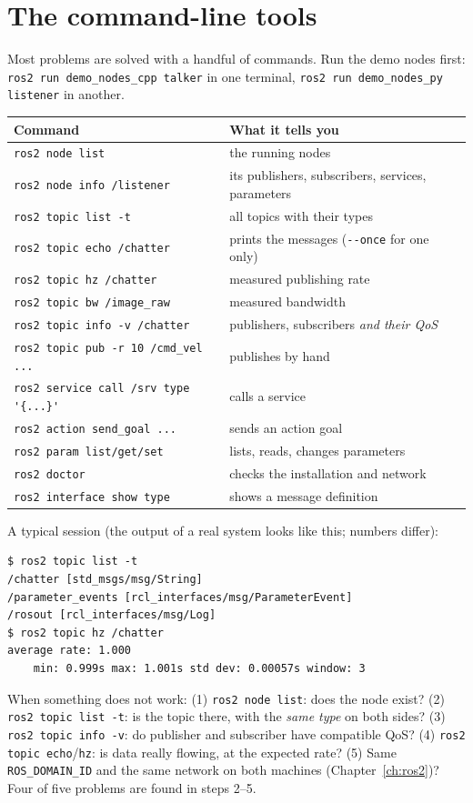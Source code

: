 \section*{The command-line tools}
Most problems are solved with a handful of commands. Run the demo nodes first: \verb!ros2 run demo_nodes_cpp talker! in one terminal, \verb!ros2 run demo_nodes_py listener! in another.
\begin{center}
\renewcommand{\arraystretch}{1.25}
\begin{tabular}{p{6.4cm}p{6.4cm}}
\textbf{Command} & \textbf{What it tells you}\\ \hline
\verb!ros2 node list! & the running nodes\\
\verb!ros2 node info /listener! & its publishers, subscribers, services, parameters\\
\verb!ros2 topic list -t! & all topics with their types\\
\verb!ros2 topic echo /chatter! & prints the messages (\verb!--once! for one only)\\
\verb!ros2 topic hz /chatter! & measured publishing rate\\
\verb!ros2 topic bw /image_raw! & measured bandwidth\\
\verb!ros2 topic info -v /chatter! & publishers, subscribers \emph{and their QoS}\\
\verb!ros2 topic pub -r 10 /cmd_vel ...! & publishes by hand\\
\verb!ros2 service call /srv type '{...}'! & calls a service\\
\verb!ros2 action send_goal ...! & sends an action goal\\
\verb!ros2 param list/get/set! & lists, reads, changes parameters\\
\verb!ros2 doctor! & checks the installation and network\\
\verb!ros2 interface show type! & shows a message definition\\
\end{tabular}
\end{center}
A typical session (the output of a real system looks like this; numbers differ):
\begin{verbatim}
$ ros2 topic list -t
/chatter [std_msgs/msg/String]
/parameter_events [rcl_interfaces/msg/ParameterEvent]
/rosout [rcl_interfaces/msg/Log]
$ ros2 topic hz /chatter
average rate: 1.000
    min: 0.999s max: 1.001s std dev: 0.00057s window: 3
\end{verbatim}
\begin{keyidea}
When something does not work: (1) \verb!ros2 node list!: does the node exist? (2) \verb!ros2 topic list -t!: is the topic there, with the \emph{same type} on both sides? (3) \verb!ros2 topic info -v!: do publisher and subscriber have compatible QoS? (4) \verb!ros2 topic echo!/\verb!hz!: is data really flowing, at the expected rate? (5) Same \verb!ROS_DOMAIN_ID! and the same network on both machines (Chapter~\ref{ch:ros2})? Four of five problems are found in steps 2--5.
\end{keyidea}

